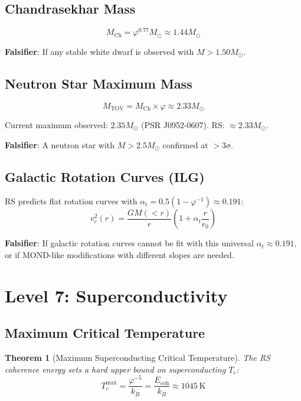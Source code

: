 \documentclass[12pt,a4paper]{article}
\newtheorem{theorem}{Theorem}[section]
\theoremstyle{definition}
\theoremstyle{remark}
\begin{document}
\subsection{Chandrasekhar Mass}

\begin{equation}
M_\mathrm{Ch} = \varphi^{0.77} M_\odot \approx 1.44 M_\odot
\end{equation}

\textbf{Falsifier}: If any stable white dwarf is observed with $M > 1.50 M_\odot$.

\subsection{Neutron Star Maximum Mass}

\begin{equation}
M_\mathrm{TOV} = M_\mathrm{Ch} \times \varphi \approx 2.33 M_\odot
\end{equation}

Current maximum observed: $2.35 M_\odot$ (PSR J0952-0607). RS: $\approx 2.33 M_\odot$.

\textbf{Falsifier}: A neutron star with $M > 2.5 M_\odot$ confirmed at $> 3\sigma$.

\subsection{Galactic Rotation Curves (ILG)}

RS predicts flat rotation curves with $\alpha_t = 0.5(1 - \varphi^{-1}) \approx 0.191$:
\begin{equation}
v_c^2(r) = \frac{GM(<r)}{r}\left(1 + \alpha_t \frac{r}{r_0}\right)
\end{equation}

\textbf{Falsifier}: If galactic rotation curves cannot be fit with this universal $\alpha_t \approx 0.191$, 
or if MOND-like modifications with different slopes are needed.

\section{Level 7: Superconductivity}

\subsection{Maximum Critical Temperature}

\begin{theorem}[Maximum Superconducting Critical Temperature]
The RS coherence energy sets a hard upper bound on superconducting $T_c$:
\begin{equation}
T_c^\mathrm{max} = \frac{\varphi^{-5}}{k_B} = \frac{E_\mathrm{coh}}{k_B} \approx 1045~\mathrm{K}
\end{equation}
\end{theorem}
\end{document}
